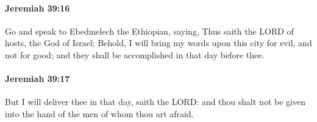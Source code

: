 		\paragraph{Jeremiah 39:16} %
			\label{JEREMIAH-39-16}

			Go and speak to Ebedmelech the Ethiopian, saying, Thus saith the LORD of hosts, the God of Israel; Behold, I will bring my words upon this city for evil, and not for good; and they shall be accomplished in that day before thee.


		\paragraph{Jeremiah 39:17} %
			\label{JEREMIAH-39-17}

			But I will deliver thee in that day, saith the LORD: and thou shalt not be given into the hand of the men of whom thou art afraid.


